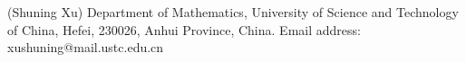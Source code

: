 \documentclass{article}
\numberwithin{equation}{section}
\begin{document}
\small


\medskip
\noindent
(Shuning Xu) Department of Mathematics, University of Science and Technology of China, Hefei, 230026, Anhui Province, China.\;
Email address: xushuning@mail.ustc.edu.cn
\end{document}
